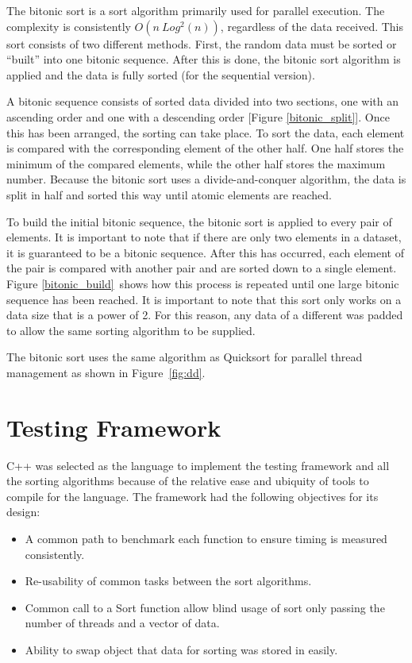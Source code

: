 \documentclass[journal]{IEEEtran}
\begin{document}
The bitonic sort is a sort algorithm primarily used for parallel execution. The complexity is consistently  $O(n\ Log^2(n))$, regardless of the data received. This sort consists of two different methods.  First, the random data must be sorted or ``built'' into one bitonic sequence.  After this is done, the bitonic sort algorithm is applied and the data is fully sorted (for the sequential version).  

A bitonic sequence consists of sorted data divided into two sections, one with an ascending order and one with a descending order [Figure \ref{bitonic_split}].   Once this has been arranged, the sorting can take place.  To sort the data, each element is compared with the corresponding element of the other half. One half stores the minimum of the compared elements, while the other half stores the maximum number.  Because the bitonic sort uses a divide-and-conquer algorithm, the data is split in half and sorted this way until atomic elements are reached.  

To build the initial bitonic sequence, the bitonic sort is applied to every pair of elements.  It is important to note that if there are only two elements in a dataset, it is guaranteed to be a bitonic sequence.  After this has occurred, each element of the pair is compared with another pair and are sorted down to a single element.  Figure \ref{bitonic_build}~shows how this process is repeated until one large bitonic sequence has been reached.  It is important to note that this sort only works on a data size that is a power of 2.  For this reason, any data of a different was padded to allow the same sorting algorithm to be supplied.

The bitonic sort uses the same algorithm as Quicksort for parallel thread management as shown in Figure~\ref{fig:dd}.

\section{Testing Framework}
\label{sec:testing}

C++ was selected as the language to implement the testing framework and all the sorting algorithms because of the relative ease and ubiquity of tools to compile for the language. The framework had the following objectives for its design:

\begin{itemize}
\item A common path to benchmark each function to ensure timing is measured consistently.
\item Re-usability of common tasks between the sort algorithms.
\item Common call to a Sort function allow blind usage of sort only passing the number of threads and a vector of data.
\item Ability to swap object that data for sorting was stored in easily.
\end{itemize}
\end{document}
